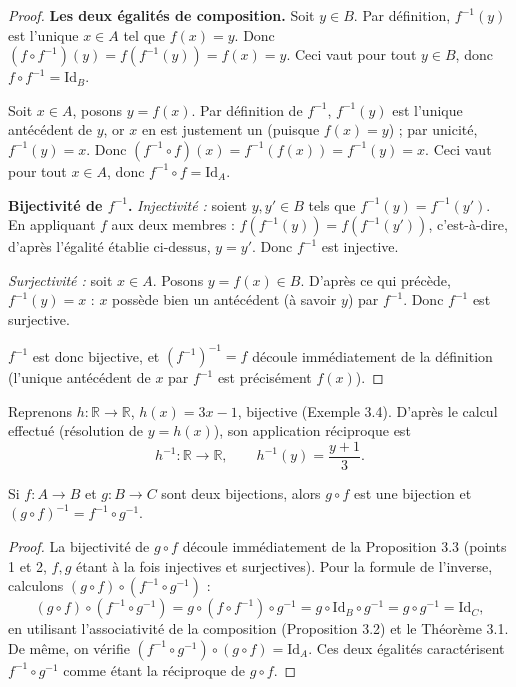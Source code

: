 \documentclass[a4paper,12pt,openany]{book}
\begin{document}
\begin{proof}
\textbf{Les deux égalités de composition.} Soit $y\in B$. Par définition,
$f^{-1}(y)$ est l'unique $x\in A$ tel que $f(x)=y$. Donc
$(f\circ f^{-1})(y) = f(f^{-1}(y)) = f(x) = y$. Ceci vaut pour tout $y\in B$,
donc $f\circ f^{-1} = \mathrm{Id}_B$.

Soit $x\in A$, posons $y=f(x)$. Par définition de $f^{-1}$, $f^{-1}(y)$ est
l'unique antécédent de $y$, or $x$ en est justement un (puisque $f(x)=y$) ;
par unicité, $f^{-1}(y)=x$. Donc $(f^{-1}\circ f)(x) = f^{-1}(f(x)) =
f^{-1}(y) = x$. Ceci vaut pour tout $x\in A$, donc $f^{-1}\circ f =
\mathrm{Id}_A$.

\textbf{Bijectivité de $f^{-1}$.} \emph{Injectivité :} soient $y,y'\in B$
tels que $f^{-1}(y)=f^{-1}(y')$. En appliquant $f$ aux deux membres :
$f(f^{-1}(y))=f(f^{-1}(y'))$, c'est-à-dire, d'après l'égalité établie
ci-dessus, $y=y'$. Donc $f^{-1}$ est injective.

\emph{Surjectivité :} soit $x\in A$. Posons $y=f(x)\in B$. D'après ce qui
précède, $f^{-1}(y)=x$ : $x$ possède bien un antécédent (à savoir $y$) par
$f^{-1}$. Donc $f^{-1}$ est surjective.

$f^{-1}$ est donc bijective, et $(f^{-1})^{-1}=f$ découle immédiatement de la
définition (l'unique antécédent de $x$ par $f^{-1}$ est précisément
$f(x)$).
\end{proof}

\begin{exemple}[3.6]
Reprenons $h : \mathbb{R} \to \mathbb{R}$, $h(x)=3x-1$, bijective (Exemple
3.4). D'après le calcul effectué (résolution de $y=h(x)$), son application
réciproque est
\[
h^{-1} : \mathbb{R}\to\mathbb{R}, \qquad h^{-1}(y) = \frac{y+1}{3}.
\]
\end{exemple}

\begin{proposition}[3.4]
Si $f:A\to B$ et $g:B\to C$ sont deux bijections, alors $g\circ f$ est une
bijection et $(g\circ f)^{-1} = f^{-1}\circ g^{-1}$.
\end{proposition}

\begin{proof}
La bijectivité de $g\circ f$ découle immédiatement de la Proposition 3.3
(points 1 et 2, $f,g$ étant à la fois injectives et surjectives). Pour la
formule de l'inverse, calculons $(g\circ f)\circ(f^{-1}\circ g^{-1})$ :
\[
(g\circ f)\circ(f^{-1}\circ g^{-1}) = g\circ (f\circ f^{-1}) \circ g^{-1}
= g \circ \mathrm{Id}_B \circ g^{-1} = g\circ g^{-1} = \mathrm{Id}_C,
\]
en utilisant l'associativité de la composition (Proposition 3.2) et le
Théorème 3.1. De même, on vérifie $(f^{-1}\circ g^{-1})\circ(g\circ f) =
\mathrm{Id}_A$. Ces deux égalités caractérisent $f^{-1}\circ g^{-1}$ comme
étant la réciproque de $g\circ f$.
\end{proof}
\end{document}
